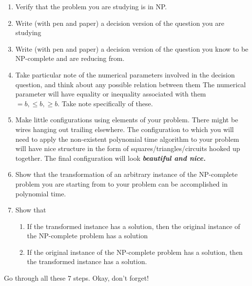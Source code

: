 \begin{mdframed}
\begin{enumerate}
\item Verify that the problem you are studying is in NP.
\item Write (with pen and paper) a decision version of the question you are studying
\item Write (with pen and paper) a decision version of the question you know to be NP-complete and are reducing from.
\item Take particular note of the numerical parameters involved in the decision question, and think about any possible relation between them
The numerical parameter will have equality or inequality associated with them \(=b, \leq b, \geq b\). Take note specifically of these.
\item Make little configurations using elements of your problem. There might be wires hanging out trailing elsewhere. 
The configuration to which you will need to apply the non-existent polynomial time algorithm to your problem will 
have nice structure in the form of squares/triangles/circuits hooked up together. The final configuration will look 
\textbf{\emph{beautiful and nice.}}
\item Show that the transformation of an arbitrary instance of the NP-complete problem you are starting from to your problem 
can be accomplished in polynomial time.
\item Show that 
\begin{enumerate}
\item If the transformed instance has a solution, then the original instance of the NP-complete problem has a solution
\item If the original instance of the NP-complete problem has a solution, then the transformed instance has a solution.
\end{enumerate}
\end{enumerate}
\end{mdframed}

Go through all these 7 steps. Okay, don't forget!

